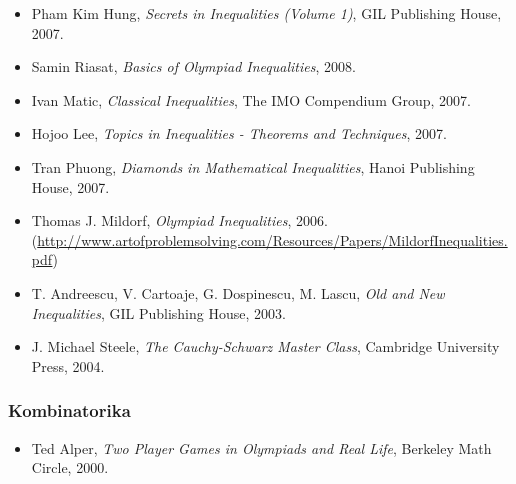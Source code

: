 \begin{itemize}
  \item Pham Kim Hung, \emph{Secrets in Inequalities (Volume 1)}, GIL
    Publishing House, 2007.
  \item Samin Riasat, \emph{Basics of Olympiad Inequalities}, 2008.
  \item Ivan Matic, \emph{Classical Inequalities}, The IMO Compendium
    Group, 2007.
  \item Hojoo Lee, \emph{Topics in Inequalities - Theorems and
    Techniques}, 2007.
  \item Tran Phuong, \emph{Diamonds in Mathematical Inequalities},
    Hanoi Publishing House, 2007.
  \item Thomas J. Mildorf, \emph{Olympiad Inequalities}, 2006.\\
    (\url{http://www.artofproblemsolving.com/Resources/Papers/MildorfInequalities.pdf})
  \item T. Andreescu, V. Cartoaje, G. Dospinescu, M. Lascu, \emph{Old
    and New Inequalities}, GIL Publishing House, 2003.
  \item J. Michael Steele, \emph{The Cauchy-Schwarz Master Class},
    Cambridge University Press, 2004.
\end{itemize}

\subsubsection{Kombinatorika}
\begin{itemize}
  \item Ted Alper, \emph{Two Player Games in Olympiads and Real Life},
    Berkeley Math Circle, 2000.
\end{itemize}
